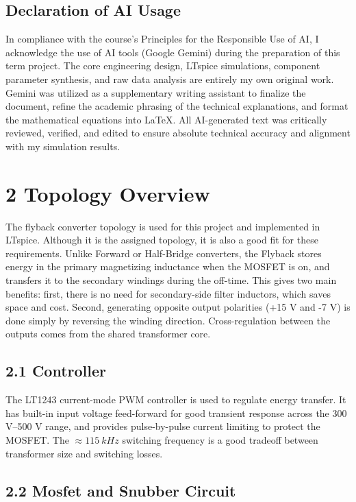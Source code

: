 \documentclass[12pt]{article}
\begin{document}
\subsection*{Declaration of AI Usage}
In compliance with the course's Principles for the Responsible Use of AI, I acknowledge the use of AI tools (Google Gemini) during the preparation of this term project. The core engineering design, LTspice simulations, component parameter synthesis, and raw data analysis are entirely my own original work. Gemini was utilized as a supplementary writing assistant to finalize the document, refine the academic phrasing of the technical explanations, and format the mathematical equations into LaTeX. All AI-generated text was critically reviewed, verified, and edited to ensure absolute technical accuracy and alignment with my simulation results.


\newpage
\section*{2 Topology Overview}

The flyback converter topology is used for this project and implemented in LTspice. Although it is the assigned topology, it is also a good fit for these requirements. Unlike Forward or Half-Bridge converters, the Flyback stores energy in the primary magnetizing inductance when the MOSFET is on, and transfers it to the secondary windings during the off-time. This gives two main benefits: first, there is no need for secondary-side filter inductors, which saves space and cost. Second, generating opposite output polarities (+15 V and -7 V) is done simply by reversing the winding direction. Cross-regulation between the outputs comes from the shared transformer core.

\subsection*{2.1 Controller}

The LT1243 current-mode PWM controller is used to regulate energy transfer. It has built-in input voltage feed-forward for good transient response across the 300 V--500 V range, and provides pulse-by-pulse current limiting to protect the MOSFET. The $\approx115~kHz$ switching frequency is a good tradeoff between transformer size and switching losses.

\subsection*{2.2 Mosfet and Snubber Circuit}
\end{document}
